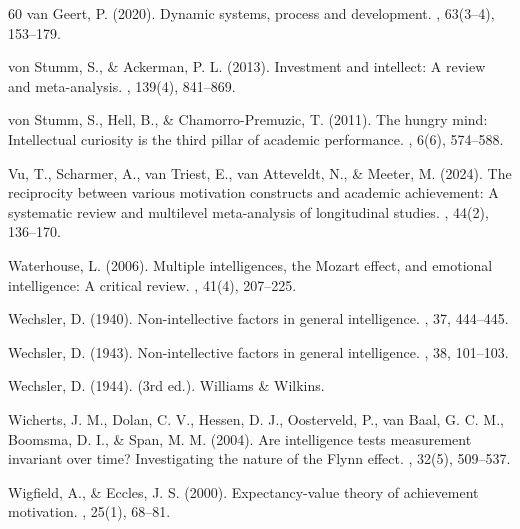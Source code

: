 \documentclass[12pt,a4paper]{article}
\begin{document}
\begin{thebibliography}{60}
van Geert, P. (2020).
\newblock Dynamic systems, process and development.
, 63(3--4), 153--179.

von Stumm, S., \& Ackerman, P. L. (2013).
\newblock Investment and intellect: A review and meta-analysis.
, 139(4), 841--869.

von Stumm, S., Hell, B., \& Chamorro-Premuzic, T. (2011).
\newblock The hungry mind: Intellectual curiosity is the third pillar of academic performance.
, 6(6), 574--588.

Vu, T., Scharmer, A., van Triest, E., van Atteveldt, N., \& Meeter, M. (2024).
\newblock The reciprocity between various motivation constructs and academic achievement: A systematic review and multilevel meta-analysis of longitudinal studies.
, 44(2), 136--170.

Waterhouse, L. (2006).
\newblock Multiple intelligences, the Mozart effect, and emotional intelligence: A critical review.
, 41(4), 207--225.

Wechsler, D. (1940).
\newblock Non-intellective factors in general intelligence.
, 37, 444--445.

Wechsler, D. (1943).
\newblock Non-intellective factors in general intelligence.
, 38, 101--103.

Wechsler, D. (1944).
 (3rd ed.).
\newblock Williams \& Wilkins.

Wicherts, J. M., Dolan, C. V., Hessen, D. J., Oosterveld, P., van Baal, G. C. M., Boomsma, D. I., \& Span, M. M. (2004).
\newblock Are intelligence tests measurement invariant over time? Investigating the nature of the Flynn effect.
, 32(5), 509--537.

Wigfield, A., \& Eccles, J. S. (2000).
\newblock Expectancy-value theory of achievement motivation.
, 25(1), 68--81.


\end{thebibliography}
\end{document}
